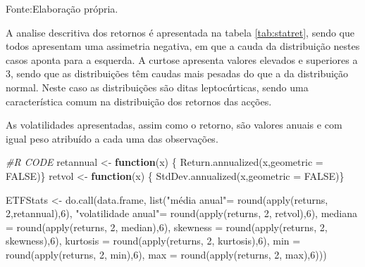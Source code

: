 \documentclass[
  12pt,
  a4paper,
  openany]{book}
\newenvironment{Shaded}{\begin{snugshade}}{\end{snugshade}}
\newcommand{\AttributeTok}[1]{\textcolor[rgb]{0.77,0.63,0.00}{#1}}
\newcommand{\CommentTok}[1]{\textcolor[rgb]{0.56,0.35,0.01}{\textit{#1}}}
\newcommand{\ConstantTok}[1]{\textcolor[rgb]{0.00,0.00,0.00}{#1}}
\newcommand{\ControlFlowTok}[1]{\textcolor[rgb]{0.13,0.29,0.53}{\textbf{#1}}}
\newcommand{\DecValTok}[1]{\textcolor[rgb]{0.00,0.00,0.81}{#1}}
\newcommand{\FunctionTok}[1]{\textcolor[rgb]{0.00,0.00,0.00}{#1}}
\newcommand{\NormalTok}[1]{#1}
\newcommand{\OtherTok}[1]{\textcolor[rgb]{0.56,0.35,0.01}{#1}}
\newcommand{\StringTok}[1]{\textcolor[rgb]{0.31,0.60,0.02}{#1}}
\theoremstyle{definition}
\theoremstyle{definition}
\theoremstyle{definition}
\theoremstyle{remark}
\begin{document}
Fonte:Elaboração própria.

\justifying
\bigskip

A analise descritiva dos retornos é apresentada na tabela \ref{tab:statret}, sendo que todos apresentam uma assimetria negativa, em que a cauda da distribuição nestes casos aponta para a esquerda. A curtose apresenta valores elevados e superiores a 3, sendo que as distribuições têm caudas mais pesadas do que a da distribuição normal. Neste caso as distribuições são ditas leptocúrticas, sendo uma característica comum na distribuição dos retornos das acções.

As volatilidades apresentadas, assim como o retorno, são valores anuais e com igual peso atribuído a cada uma das observações.

\scriptsize

\begin{Shaded}
\begin{Highlighting}[]
\CommentTok{\#R CODE}
\NormalTok{retannual }\OtherTok{\textless{}{-}} \ControlFlowTok{function}\NormalTok{(x) \{  }
  \FunctionTok{Return.annualized}\NormalTok{(x,}\AttributeTok{geometric =} \ConstantTok{FALSE}\NormalTok{)\}}
\NormalTok{retvol }\OtherTok{\textless{}{-}} \ControlFlowTok{function}\NormalTok{(x) \{  }
  \FunctionTok{StdDev.annualized}\NormalTok{(x,}\AttributeTok{geometric =} \ConstantTok{FALSE}\NormalTok{)\}}

\NormalTok{ETFStats }\OtherTok{\textless{}{-}} \FunctionTok{do.call}\NormalTok{(data.frame, }
                    \FunctionTok{list}\NormalTok{(}\StringTok{"média anual"}\OtherTok{=} \FunctionTok{round}\NormalTok{(}\FunctionTok{apply}\NormalTok{(returns, }\DecValTok{2}\NormalTok{,retannual),}\DecValTok{6}\NormalTok{),}
                         \StringTok{"volatilidade anual"}\OtherTok{=} \FunctionTok{round}\NormalTok{(}\FunctionTok{apply}\NormalTok{(returns, }\DecValTok{2}\NormalTok{, retvol),}\DecValTok{6}\NormalTok{),}
                         \AttributeTok{mediana =} \FunctionTok{round}\NormalTok{(}\FunctionTok{apply}\NormalTok{(returns, }\DecValTok{2}\NormalTok{, median),}\DecValTok{6}\NormalTok{),}
                         \AttributeTok{skewness =} \FunctionTok{round}\NormalTok{(}\FunctionTok{apply}\NormalTok{(returns, }\DecValTok{2}\NormalTok{, skewness),}\DecValTok{6}\NormalTok{),}
                         \AttributeTok{kurtosis =} \FunctionTok{round}\NormalTok{(}\FunctionTok{apply}\NormalTok{(returns, }\DecValTok{2}\NormalTok{, kurtosis),}\DecValTok{6}\NormalTok{),}
                         \AttributeTok{min =} \FunctionTok{round}\NormalTok{(}\FunctionTok{apply}\NormalTok{(returns, }\DecValTok{2}\NormalTok{, min),}\DecValTok{6}\NormalTok{),}
                         \AttributeTok{max =} \FunctionTok{round}\NormalTok{(}\FunctionTok{apply}\NormalTok{(returns, }\DecValTok{2}\NormalTok{, max),}\DecValTok{6}\NormalTok{)))}
\end{Highlighting}
\end{Shaded}
\end{document}

